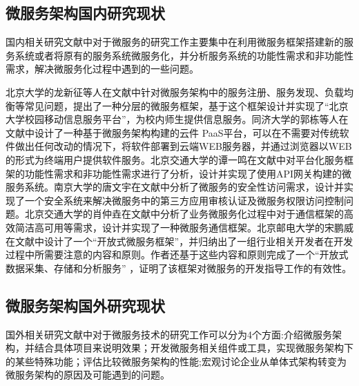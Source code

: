 \subsection{微服务架构国内研究现状}
国内相关研究文献中对于微服务的研究工作主要集中在利用微服务框架搭建新的服务系统或者将原有的服务系统微服务化，并分析服务系统的功能性需求和非功能性需求，解决微服务化过程中遇到的一些问题。

北京大学的龙新征等人在文献\cite{龙新征2017基于微服务框架的信息服务平台}中针对微服务架构中的服务注册、服务发现、负载均衡等常见问题，提出了一种分层的微服务框架，基于这个框架设计并实现了“北京大学校园移动信息服务平台”，为校内师生提供信息服务。同济大学的郭栋等人在文献\cite{郭栋2015一种基于微服务架构的新型云件}中设计了一种基于微服务架构构建的云件 PaaS平台，可以在不需要对传统软件做出任何改动的情况下，将软件部署到云端WEB服务器，并通过浏览器以WEB的形式为终端用户提供软件服务。北京交通大学的谭一鸣在文献\cite{谭一鸣2017基于微服务架构的平台化服务框架的设计与实现}中对平台化服务框架的功能性需求和非功能性需求进行了分析，设计并实现了使用API网关构建的微服务系统。南京大学的唐文宇在文献\cite{唐文宇2016面向}中分析了微服务的安全性访问需求，设计并实现了一个安全系统来解决微服务中的第三方应用审核认证及微服务权限访问控制问题。北京交通大学的肖仲垚在文献\cite{肖仲垚2017微服务通信框架的设计与实现}中分析了业务微服务化过程中对于通信框架的高效简洁高可用等需求，设计并实现了一种微服务通信框架。北京邮电大学的宋鹏威在文献\cite{宋鹏威2017开放式微服务框架的设计与应用}中设计了一个“开放式微服务框架”，并归纳出了一组行业相关开发者在开发过程中所需要注意的内容和原则。作者还基于这些内容和原则完成了一个“开放式数据采集、存储和分析服务” ，证明了该框架对微服务的开发指导工作的有效性。

\subsection{微服务架构国外研究现状}
国外相关研究文献中对于微服务技术的研究工作可以分为4个方面:介绍微服务架构，并结合具体项目来说明效果；开发微服务相关组件或工具，实现微服务架构下的某些特殊功能；评估比较微服务架构的性能;宏观讨论企业从单体式架构转变为微服务架构的原因及可能遇到的问题。

